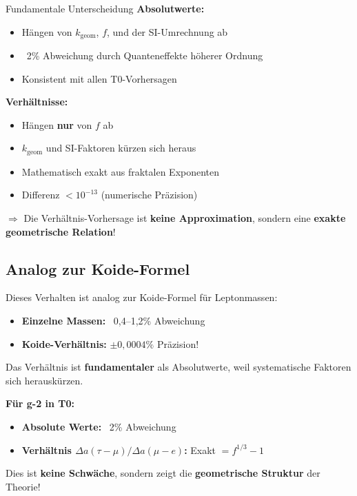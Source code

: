 	\begin{important}{Fundamentale Unterscheidung}
		\textbf{Absolutwerte:}
		\begin{itemize}
			\item Hängen von $k_{\text{geom}}$, $f$, und der SI-Umrechnung ab
			\item ~2\% Abweichung durch Quanteneffekte höherer Ordnung
			\item Konsistent mit allen T0-Vorhersagen
		\end{itemize}
		
		\textbf{Verhältnisse:}
		\begin{itemize}
			\item Hängen \textbf{nur} von $f$ ab
			\item $k_{\text{geom}}$ und SI-Faktoren kürzen sich heraus
			\item Mathematisch exakt aus fraktalen Exponenten
			\item Differenz $< 10^{-13}$ (numerische Präzision)
		\end{itemize}
		
		$\Rightarrow$ Die Verhältnis-Vorhersage ist \textbf{keine Approximation}, sondern eine \textbf{exakte geometrische Relation}!
	\end{important}
	
	\subsection{Analog zur Koide-Formel}
	
	Dieses Verhalten ist analog zur Koide-Formel für Leptonmassen:
	
	\begin{itemize}
		\item \textbf{Einzelne Massen:} ~0{,}4--1{,}2\% Abweichung
		\item \textbf{Koide-Verhältnis:} $\pm 0{,}0004\%$ Präzision!
	\end{itemize}
	
	Das Verhältnis ist \textbf{fundamentaler} als Absolutwerte, weil systematische Faktoren sich herauskürzen.
	
	\textbf{Für g-2 in T0:}
	\begin{itemize}
		\item \textbf{Absolute Werte:} ~2\% Abweichung
		\item \textbf{Verhältnis $\Delta a(\tau-\mu)/\Delta a(\mu-e)$:} Exakt $= f^{1/3} - 1$
	\end{itemize}
	
	Dies ist \textbf{keine Schwäche}, sondern zeigt die \textbf{geometrische Struktur} der Theorie!	
